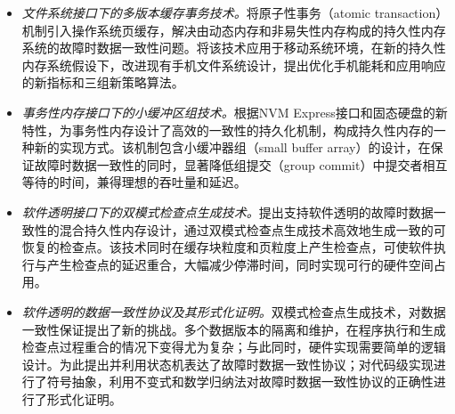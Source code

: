 \begin{cabstract}
\begin{itemize}
\item \emph{文件系统接口下的多版本缓存事务技术。}将原子性事务（atomic transaction）机制引入操作系统页缓存，解决由动态内存和非易失性内存构成的持久性内存系统的故障时数据一致性问题。将该技术应用于移动系统环境，在新的持久性内存系统假设下，改进现有手机文件系统设计，提出优化手机能耗和应用响应的新指标和三组新策略算法。
\item \emph{事务性内存接口下的小缓冲区组技术。}根据NVM Express接口和固态硬盘的新特性，为事务性内存设计了高效的一致性的持久化机制，构成持久性内存的一种新的实现方式。该机制包含小缓冲器组（small buffer array）的设计，在保证故障时数据一致性的同时，显著降低组提交（group commit）中提交者相互等待的时间，兼得理想的吞吐量和延迟。
\item \emph{软件透明接口下的双模式检查点生成技术。}提出支持软件透明的故障时数据一致性的混合持久性内存设计，通过双模式检查点生成技术高效地生成一致的可恢复的检查点。该技术同时在缓存块粒度和页粒度上产生检查点，可使软件执行与产生检查点的延迟重合，大幅减少停滞时间，同时实现可行的硬件空间占用。
\item \emph{软件透明的数据一致性协议及其形式化证明。}双模式检查点生成技术，对数据一致性保证提出了新的挑战。多个数据版本的隔离和维护，在程序执行和生成检查点过程重合的情况下变得尤为复杂；与此同时，硬件实现需要简单的逻辑设计。为此提出并利用状态机表达了故障时数据一致性协议；对代码级实现进行了符号抽象，利用不变式和数学归纳法对故障时数据一致性协议的正确性进行了形式化证明。
\end{itemize}

\end{cabstract}


